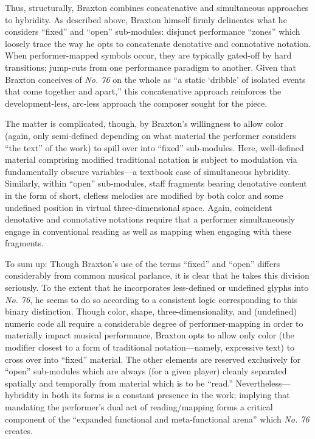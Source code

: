         Thus, structurally, Braxton combines concatenative and simultaneous approaches to hybridity. As described above, Braxton himself firmly delineates what he considers ``fixed'' and ``open'' sub-modules: disjunct performance ``zones'' which loosely trace the way he opts to concatenate denotative and connotative notation. When performer-mapped symbols occur, they are typically gated-off by hard transitions; jump-cuts from one performance paradigm to another. Given that Braxton conceives of \textit{No. 76} on the whole as ``a static `dribble' of isolated events that come together and apart,'' this concatenative approach reinforces the development-less, arc-less approach the composer sought for the piece.\autocite[148]{Braxton_1988} 

        The matter is complicated, though, by Braxton's willingness to allow color (again, only semi-defined depending on what material the performer considers ``the text'' of the work) to spill over into ``fixed'' sub-modules. Here, well-defined material comprising modified traditional notation is subject to modulation via fundamentally obscure variables---a textbook case of simultaneous hybridity. Similarly, within ``open'' sub-modules, staff fragments bearing denotative content in the form of short, clefless melodies are modified by both color and some undefined position in virtual three-dimensional space. Again, coincident denotative and connotative notations require that a performer simultaneously engage in conventional reading as well as mapping when engaging with these fragments.

        To sum up: Though Braxton's use of the terms ``fixed'' and ``open'' differs considerably from common musical parlance, it is clear that he takes this division seriously. To the extent that he incorporates less-defined or undefined glyphs into \textit{No. 76}, he seems to do so according to a consistent logic corresponding to this binary distinction. Though color, shape, three-dimensionality, and (undefined) numeric code all require a considerable degree of performer-mapping in order to materially impact musical performance, Braxton opts to allow only color (the modifier closest to a form of traditional notation---namely, expressive text) to cross over into ``fixed''  material. The other elements are reserved exclusively for ``open'' sub-modules which are always (for a given player) cleanly separated spatially and temporally from material which is to be ``read.'' Nevertheless---hybridity in both its forms is a constant presence in the work; implying that mandating the performer's dual act of reading/mapping forms a critical component of the ``expanded functional and meta-functional arena'' which \textit{No. 76} creates.

